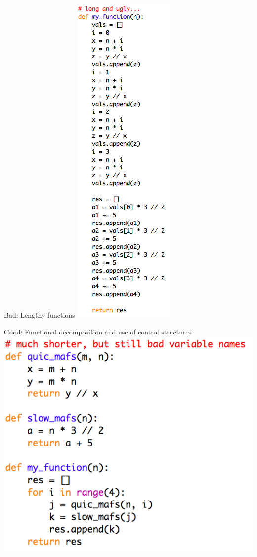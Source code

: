 \documentclass[week2]{csse1001}
\begin{document}
\begin{topic}{Bad: Lengthy functions}
\includegraphics[height=0.9\textheight]{bad_python/long}
\end{topic}

\begin{topic}{Good: Functional decomposition and use of control structures}
\includegraphics[height=0.9\textheight]{bad_python/short}
\end{topic}
\end{document}
